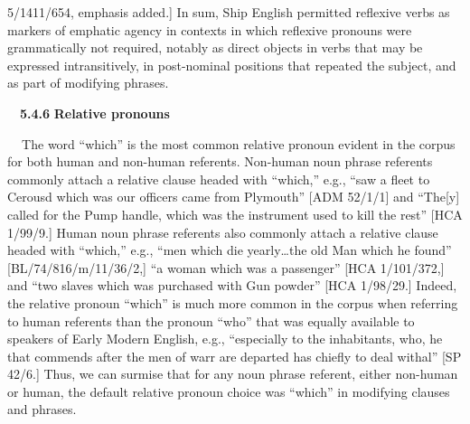 \begin{styleStandard}
5/1411/654, emphasis added.] In sum, Ship English permitted reflexive verbs as markers of emphatic agency in contexts in which reflexive pronouns were grammatically not required, notably as direct objects in verbs that may be expressed intransitively, in post-nominal positions that repeated the subject, and as part of modifying phrases. 
\end{styleStandard}

\begin{styleStandard}
\ \ \textbf{5.4.6} \textbf{Relative pronouns}
\end{styleStandard}

\begin{styleStandard}
\textbf{\ \ }The word “which” is the most common relative pronoun evident in the corpus for both human and non-human referents. Non-human noun phrase referents commonly attach a relative clause headed with “which,” e.g., “saw a fleet to Cerousd which was our officers came from Plymouth” [ADM 52/1/1] and “The[y] called for the Pump handle, which was the instrument used to kill the rest” [HCA 1/99/9.] Human noun phrase referents also commonly attach a relative clause headed with “which,” e.g., “men which die yearly…the old Man which he found” [BL/74/816/m/11/36/2,] “a woman which was a passenger” [HCA 1/101/372,] and “two slaves which was purchased with Gun powder” [HCA 1/98/29.] Indeed, the relative pronoun “which” is much more common in the corpus when referring to human referents than the pronoun “who” that was equally available to speakers of Early Modern English, e.g., “especially to the inhabitants, who, he that commends after the men of warr are departed has chiefly to deal withal” [SP 42/6.] Thus, we can surmise that for any noun phrase referent, either non-human or human, the default relative pronoun choice was “which” in modifying clauses and phrases. 
\end{styleStandard}

